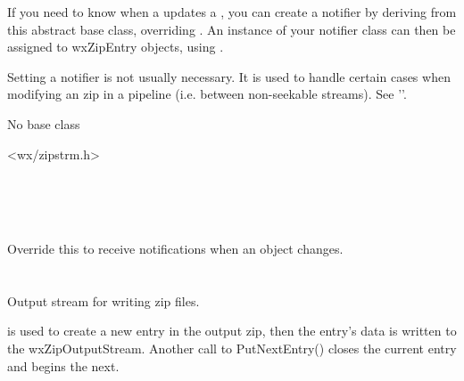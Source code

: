 If you need to know when a 
updates a ,
you can create a notifier by deriving from this abstract base class,
overriding .
An instance of your notifier class can then be assigned to wxZipEntry
objects, using .

Setting a notifier is not usually necessary. It is used to handle
certain cases when modifying an zip in a pipeline (i.e. between
non-seekable streams).
See ''.


No base class


<wx/zipstrm.h>




\\
\\
\\



\label{wxzipnotifieronentryupdated}


Override this to receive notifications when
an  object changes.


%
%

\section{}\label{wxzipoutputstream}

Output stream for writing zip files.

 is used to create
a new entry in the output zip, then the entry's data is written to the
wxZipOutputStream.  Another call to PutNextEntry() closes the current
entry and begins the next.

